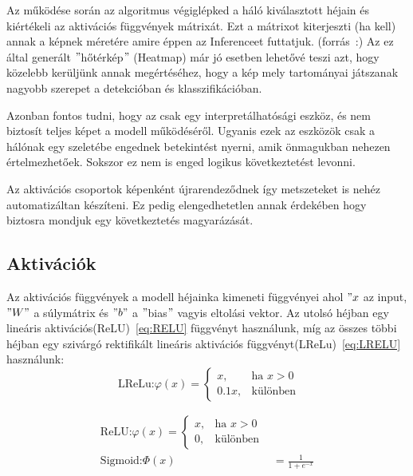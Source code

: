 \documentclass[12pt,oneside,a4paper]{article}
\theoremstyle{remark}
\begin{document}
    Az  működése során az algoritmus végiglépked a háló kiválasztott héjain és kiértékeli
     az aktivációs függvények mátrixát.
    Ezt a mátrixot kiterjeszti (ha kell) annak a képnek méretére amire éppen az \gls{Inference}et futtatjuk.
    (forrás~\cite{muhammad2020eigencam}:)
    Az ez által generált \("\)hőtérkép\("\) (Heatmap) már jó esetben lehetővé teszi azt, hogy közelebb kerüljünk
     annak megértéséhez, hogy a kép mely tartományai játszanak nagyobb szerepet a detekcióban és klasszifikációban.

     Azonban fontos tudni, hogy az  csak egy interpretálhatósági eszköz, és nem biztosít teljes képet
     a modell működéséről.
     Ugyanis ezek az eszközök csak a hálónak egy szeletébe engednek betekintést nyerni, amik önmagukban nehezen értelmezhetőek.
     Sokszor ez nem is enged logikus következtetést levonni.

     Az aktivációs csoportok képenként újrarendeződnek így metszeteket is nehéz automatizáltan készíteni.
     Ez pedig elengedhetetlen annak érdekében hogy biztosra mondjuk egy következtetés magyarázását.

\subsection{Aktivációk}\label{subsec:activations}
Az aktivációs függvények a modell héjainka kimeneti függvényei ahol \("x\) az input, \("W"\) a súlymátrix és \("b"\) a
    \("\)bias\("\) vagyis eltolási vektor.
        Az utolsó héjban egy lineáris aktivációs(\ac{ReLU})~\eqref{eq:RELU}\label{alignhivatkozas} függvényt használunk,
    míg az összes többi héjban egy
    szivárgó rektifikált lineáris aktivációs függvényt(\ac{LReLu})~\eqref{eq:LRELU}\label{eqhivatkozas} használunk:
    \begin{equation}
        \text{ LReLu:}
    \varphi(x) = \begin{cases}
      x, & \text{ha } x > 0 \\
      0.1x, & \text{különben}
    \end{cases}\label{eq:LRELU}
    \end{equation}\label{eq:activation_functions}


    \begin{align}
    \text{ReLU:}
    \varphi(x)=\begin{cases}
      x, & \text{ha } x > 0 \\
      0, & \text{különben} \end{cases}\label{eq:RELU} \\
    \text{Sigmoid:}
    \varPhi(x) &= \frac{1}{1 + e^{-x}} \label{eq:Sigmoid}
    \end{align}
\end{document}
